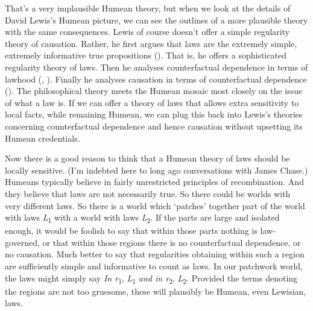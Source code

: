 \documentclass[
  11pt,
  letterpaper,
  DIV=11,
  numbers=noendperiod,
  twoside]{scrartcl}
\begin{document}
That's a very implausible Humean theory, but when we look at the details
of David Lewis's Humean picture, we can see the outlines of a more
plausible theory with the same consequences. Lewis of course doesn't
offer a simple regularity theory of causation. Rather, he first argues
that laws are the extremely simple, extremely informative true
propositions (). That is, he
offers a sophisticated regularity theory of laws. Then he analyses
counterfactual dependence in terms of lawhood
(,
). Finally he analyses causation in terms
of counterfactual dependence ().
The philosophical theory meets the Humean mosaic most closely on the
issue of what a law is. If we can offer a theory of laws that allows
extra sensitivity to local facts, while remaining Humean, we can plug
this back into Lewis's theories concerning counterfactual dependence and
hence causation without upsetting its Humean credentials.

Now there is a good reason to think that a Humean theory of laws should
be locally sensitive. (I'm indebted here to long ago conversations with
James Chase.) Humeans typically believe in fairly unrestricted
principles of recombination. And they believe that laws are not
necessarily true. So there could be worlds with very different laws. So
there is a world which `patches' together part of the world with laws
\emph{L}\textsubscript{1} with a world with laws
\emph{L}\textsubscript{2}. If the parts are large and isolated enough,
it would be foolish to say that within those parts nothing is
law-governed, or that within those regions there is no counterfactual
dependence, or no causation. Much better to say that regularities
obtaining within such a region are sufficiently simple and informative
to count as laws. In our patchwork world, the laws might simply say
\emph{In r}\textsubscript{1}, \emph{L}\textsubscript{1} \emph{and in
r}\textsubscript{2}, \emph{L}\textsubscript{2}. Provided the terms
denoting the regions are not too gruesome, these will plausibly be
Humean, even Lewisian, laws.
\end{document}
